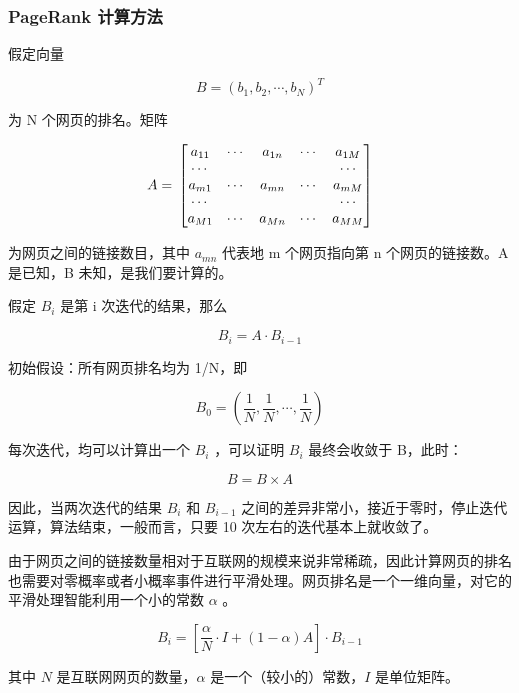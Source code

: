 \documentclass[11pt]{article}
\begin{document}
\subsubsection{PageRank 计算方法}
\label{sec:org2e3f252}
假定向量

\begin{equation}
B = (b_{1},b_{2}, \cdots ,b_{N})^{T}
\end{equation}

为 N 个网页的排名。矩阵

\begin{equation}
A = \\
\begin{bmatrix}
a_{11}&\cdots&a_{1n}&\cdots&a_{1M}\\
\cdots& & & &\cdots\\
a_{m1}&\cdots&a_{mn}&\cdots&a_{mM}\\
\cdots& & & &\cdots\\
a_{M1}&\cdots&a_{Mn}&\cdots&a_{MM}
\end{bmatrix}
\end{equation}

为网页之间的链接数目，其中 \(a_{mn}\) 代表地 m 个网页指向第 n 个网页的链接数。A 是已知，B 未知，是我们要计算的。

假定 \(B_{i}\) 是第 i 次迭代的结果，那么

\begin{equation}
B_{i} = A \cdot B_{i-1}
\end{equation}

初始假设：所有网页排名均为 1/N，即

$$B_{0} = \left(\frac{1}{N},\frac{1}{N},\cdots,\frac{1}{N}\right)$$

每次迭代，均可以计算出一个 \(B_{i}\) ，可以证明 \(B_{i}\) 最终会收敛于 B，此时：

$$B = B \times A$$

因此，当两次迭代的结果 \(B_{i}\) 和 \(B_{i-1}\) 之间的差异非常小，接近于零时，停止迭代运算，算法结束，一般而言，只要 10 次左右的迭代基本上就收敛了。

由于网页之间的链接数量相对于互联网的规模来说非常稀疏，因此计算网页的排名也需要对零概率或者小概率事件进行平滑处理。网页排名是一个一维向量，对它的平滑处理智能利用一个小的常数 \(\alpha\) 。

\begin{equation}
B_{i} = \left[\frac{\alpha}{N} \cdot I + (1 - \alpha)A\right] \cdot B_{i-1}
\end{equation}

其中 \(N\) 是互联网网页的数量，\(\alpha\) 是一个（较小的）常数，\(I\) 是单位矩阵。
\end{document}
